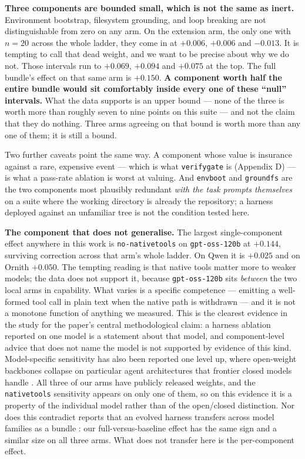 \documentclass[
  10pt,
  a4paper,
]{article}
\newcounter{none} %
\let\oldtexttt\texttt
\renewcommand{\texttt}[1]{{\small\oldtexttt{#1}}}
\begin{document}
\textbf{Three components are bounded small, which is not the same as
inert.} Environment bootstrap, filesystem grounding, and loop breaking
are not distinguishable from zero on any arm. On the extension arm, the
only one with \(n=20\) across the whole ladder, they come in at
\(+0.006\), \(+0.006\) and \(-0.013\). It is tempting to call that dead
weight, and we want to be precise about why we do not. Those intervals
run to \(+0.069\), \(+0.094\) and \(+0.075\) at the top. The full
bundle's effect on that same arm is \(+0.150\). \textbf{A component
worth half the entire bundle would sit comfortably inside every one of
these ``null'' intervals.} What the data supports is an upper bound ---
none of the three is worth more than roughly seven to nine points on
this suite --- and not the claim that they do nothing. Three arms
agreeing on that bound is worth more than any one of them; it is still a
bound.

Two further caveats point the same way. A component whose value is
insurance against a rare, expensive event --- which is what
\texttt{verifygate} is (Appendix D) --- is what a pass-rate ablation is
worst at valuing. And \texttt{envboot} and \texttt{groundfs} are the two
components most plausibly redundant \emph{with the task prompts
themselves} on a suite where the working directory is already the
repository; a harness deployed against an unfamiliar tree is not the
condition tested here.

\textbf{The component that does not generalise.} The largest
single-component effect anywhere in this work is \texttt{no-nativetools}
on \texttt{gpt-oss-120b} at \(+0.144\), surviving correction across that
arm's whole ladder. On Qwen it is \(+0.025\) and on Ornith \(+0.050\).
The tempting reading is that native tools matter more to weaker models;
the data does not support it, because \texttt{gpt-oss-120b} sits
\emph{between} the two local arms in capability. What varies is a
specific competence --- emitting a well-formed tool call in plain text
when the native path is withdrawn --- and it is not a monotone function
of anything we measured. This is the clearest evidence in the study for
the paper's central methodological claim: a harness ablation reported on
one model is a statement about that model, and component-level advice
that does not name the model is not supported by evidence of this kind.
Model-specific sensitivity has also been reported one level up, where
open-weight backbones collapse on particular agent architectures that
frontier closed models handle \citep{bandel2026general}. All three of
our arms have publicly released weights, and the \texttt{nativetools}
sensitivity appears on only one of them, so on this evidence it is a
property of the individual model rather than of the open/closed
distinction. Nor does this contradict reports that an evolved harness
transfers across model families as a bundle \citep{lin2026ahe}: our
full-versus-baseline effect has the same sign and a similar size on all
three arms. What does not transfer here is the per-component effect.
\end{document}

